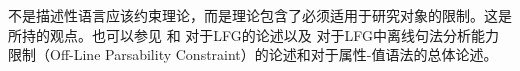 \largerpage
不是描述性语言应该约束理论，而是理论包含了必须适用于研究对象的限制。这是 \citet[, 280]{Chomsky81b}所持的观点。也可以参见 和 对于LFG的论述以及 对于LFG中离线句法分析能力限制（Off-Line Parsability Constraint）的论述和对于属性-值语法的总体论述。
